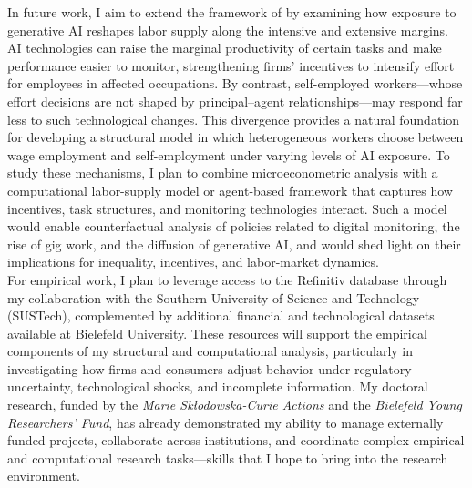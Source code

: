 \documentclass{nfr}
\begin{document}
In future work, I aim to extend the framework of \citet{bick2022structural} by examining how exposure to generative AI reshapes labor supply along the intensive and extensive margins. 
AI technologies can raise the marginal productivity of certain tasks and make performance easier to monitor, strengthening firms’ incentives to intensify effort for employees in affected occupations. 
By contrast, self-employed workers—whose effort decisions are not shaped by principal–agent relationships—may respond far less to such technological changes. 
This divergence provides a natural foundation for developing a structural model in which heterogeneous workers choose between wage employment and self-employment under varying levels of AI exposure.
To study these mechanisms, I plan to combine microeconometric analysis with a computational labor-supply model or agent-based framework that captures how incentives, task structures, and monitoring technologies interact. 
Such a model would enable counterfactual analysis of policies related to digital monitoring, the rise of gig work, and the diffusion of generative AI, and would shed light on their implications for inequality, incentives, and labor-market dynamics.\\

For empirical work, I plan to leverage access to the Refinitiv database through my collaboration with the Southern University of Science and Technology (SUSTech), complemented by additional financial and technological datasets available at Bielefeld University. 
These resources will support the empirical components of my structural and computational analysis, particularly in investigating how firms and consumers adjust behavior under regulatory uncertainty, technological shocks, and incomplete information. 
My doctoral research, funded by the \textit{Marie Skłodowska-Curie Actions} and the \textit{Bielefeld Young Researchers’ Fund}, has already demonstrated my ability to manage externally funded projects, collaborate across institutions, and coordinate complex empirical and computational research tasks—skills that I hope to bring into the research environment.\\
\end{document}

